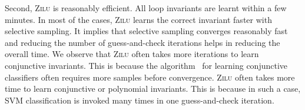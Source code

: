 

Second, \textsc{Zilu} is reasonably efficient. All loop invariants are learnt within a few minutes. In most of the cases, \textsc{Zilu} learns the correct invariant faster with selective sampling. It implies that selective sampling converges reasonably fast and reducing the number of guess-and-check iterations helps in reducing the overall time. We observe that \textsc{Zilu} often takes more iterations to learn conjunctive invariants. This is because the algorithm~\cite{sharma2012interpolants} for learning conjunctive classifiers often requires more samples before convergence. \textsc{Zilu} often takes more time to learn conjunctive or polynomial invariants. This is because in such a case, SVM classification is invoked many times in one guess-and-check iteration.


